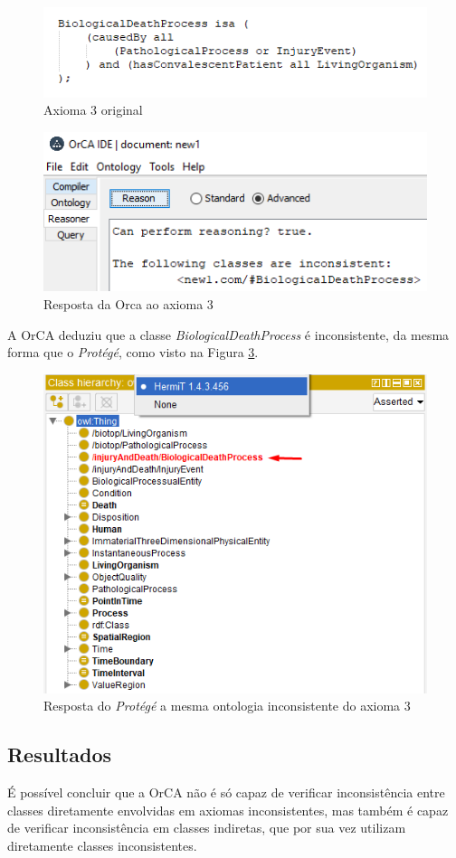 \documentclass{bcc}
\begin{document}
\begin{figure}[H]
\centering
\includegraphics[width=.6\textwidth]{Figuras/axiomai_3_o.png}
\caption{Axioma 3 original} 
\label{fig:axiomai_3_o}
\end{figure}

\begin{figure}[H]
\centering
\includegraphics[width=.6\textwidth]{Figuras/axiomai_3_res.png}
\caption{Resposta da Orca ao axioma 3} 
\label{fig:axiomai_3_res}
\end{figure}

A OrCA deduziu que a classe \textit{BiologicalDeathProcess} é inconsistente, da mesma forma que o \textit{Protégé}, como visto na Figura \ref{fig:axiomai_3_protege}.

\begin{figure}[H]
\centering
\includegraphics[width=.5\textwidth]{Figuras/axiomai_3_protege.png}
\caption{Resposta do \textit{Protégé} a mesma ontologia inconsistente do axioma 3} 
\label{fig:axiomai_3_protege}
\end{figure}

\subsection{Resultados}
É possível concluir que a OrCA não é só capaz de verificar inconsistência entre classes diretamente envolvidas em axiomas inconsistentes, mas também é capaz de verificar inconsistência em classes indiretas, que por sua vez utilizam diretamente classes inconsistentes.
\end{document}
